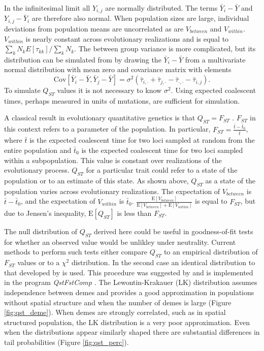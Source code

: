 \documentclass{article}
\newcommand{\E}{\mathrm{E}}
\newcommand{\Cov}{\mathrm{Cov}}
\begin{document}
In the infinitesimal limit all $Y_{i,j}$ are normally distributed. The terms
$\bar{Y}_{i} - \bar{Y}$ and $Y_{i,j} - \bar{Y}_i$ are therefore also normal.
When population sizes are large, individual deviations from population means are
uncorrelated as are $V_{between}$ and $V_{within}$. $V_{within}$ is nearly
constant across evolutionary realizations and is equal to $\sum_k N_k
E[\tau_{kk}] / \sum_k N_k$. The between group variance is more complicated, but
its distribution can be simulated from by drawing the $\bar{Y}_{i} - \bar{Y}$ from a
multivariate normal distribution with mean zero and covariance matrix with elements
\begin{equation}
  \Cov[\bar{Y}_{i} - \bar{Y}, \bar{Y}_{j} - \bar{Y}] =
  \sigma^2(\bar{\tau}_{i,\cdot} + \bar{\tau}_{j,\cdot} - \bar{\tau}_{\cdot,\cdot} - \bar{\tau}_{i,j}).
\end{equation}
To simulate $Q_{ST}$ values it is not necessary to know $\sigma^2$. Using
expected coalescent times, perhaps measured in units of mutations, are
sufficient for simulation.

A classical result in evolutionary quantitative genetics is that $Q_{ST}=F_{ST}$
\citep{Whitlock1999}. $F_{ST}$ in this context refers to a parameter of the
population. In particular, $F_{ST} = \frac{\bar{t} - \bar{t}_0}{\bar{t}}$, where
$\bar{t}$ is the expected coalescent time for two loci sampled at random from
the entire population and $\bar{t}_0$ is the expected coalescent time for two
loci sampled within a subpopulation. This value is constant over realizations of
the evolutionary process. $Q_{ST}$ for a particular trait could refer to a state
of the population or to an estimate of this state. As shown above, $Q_{ST}$ as a
state of the population varies across evolutionary realizations. The expectation
of $V_{between}$ is $\bar{t} - \bar{t}_0$, and the expectation of $V_{within}$
is $\bar{t}_0$. $\frac{\E[V_{between}]}{\E[V_{between}] + \E[V_{within}]}$ is
equal to $F_{ST}$, but due to Jensen's inequality, $\E[Q_{ST}]$ is less
than $F_{ST}$.

The null distribution of $Q_{ST}$ derived here could be useful in
goodness-of-fit tests for whether an observed value would be unlikley under
neutrality. Current methods to perform such tests either compare $Q_{ST}$ to an
empirical distribution of $F_{ST}$ values or to a $\chi^2$ distribution. In the
second case an identical distribution to that developed by \citet{Lewontin1973}
is used. This procedure was suggested by \citet{Whitlock2009} and is implemented
in the program \textit{QstFstComp} \citep{Gilbert2015}. The Lewontin-Krakauer
(LK) distribution assumes independence between demes and provides a good
approximation in populations without spatial structure and when the number of
demes is large (Figure \ref{fig:qst_deme}). When demes are strongly correlated,
such as in spatial structured population, the LK distribution is a very poor
approximation. Even when the distributions appear similarly shaped there are
substantial differences in tail probabilities (Figure \ref{fig:qst_perc}).
\end{document}

